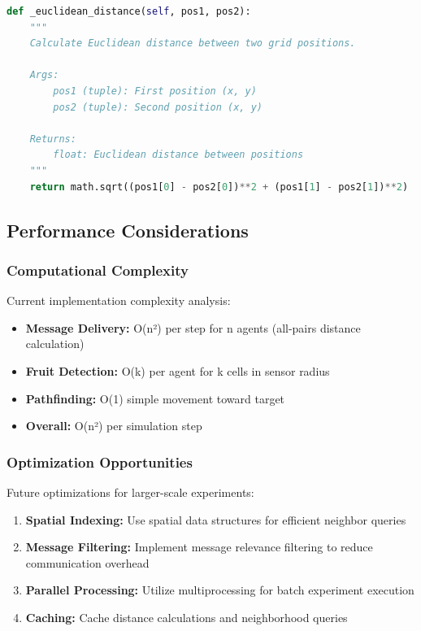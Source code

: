 \documentclass[12pt,a4paper]{article}
\begin{document}
\begin{lstlisting}[language=Python, caption=Documentation Example]
def _euclidean_distance(self, pos1, pos2):
    """
    Calculate Euclidean distance between two grid positions.

    Args:
        pos1 (tuple): First position (x, y)
        pos2 (tuple): Second position (x, y)

    Returns:
        float: Euclidean distance between positions
    """
    return math.sqrt((pos1[0] - pos2[0])**2 + (pos1[1] - pos2[1])**2)
\end{lstlisting}

\subsection{Performance Considerations}

\subsubsection{Computational Complexity}

Current implementation complexity analysis:

\begin{itemize}
    \item \textbf{Message Delivery:} O(n²) per step for n agents (all-pairs distance calculation)
    \item \textbf{Fruit Detection:} O(k) per agent for k cells in sensor radius
    \item \textbf{Pathfinding:} O(1) simple movement toward target
    \item \textbf{Overall:} O(n²) per simulation step
\end{itemize}

\subsubsection{Optimization Opportunities}

Future optimizations for larger-scale experiments:

\begin{enumerate}
    \item \textbf{Spatial Indexing:} Use spatial data structures for efficient neighbor queries
    \item \textbf{Message Filtering:} Implement message relevance filtering to reduce communication overhead
    \item \textbf{Parallel Processing:} Utilize multiprocessing for batch experiment execution
    \item \textbf{Caching:} Cache distance calculations and neighborhood queries
\end{enumerate}
\end{document}
